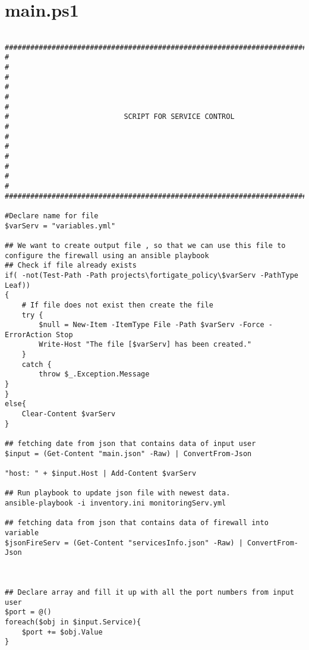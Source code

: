 \documentclass[dutch,dit,thesis]{hogentreport}
\begin{document}
\section{main.ps1}
\label{code:main.ps1}
\begin{lstlisting}[caption={main.ps1 Powershell script}]

###################################################################################
#                                                                                 #
#                                                                                 #
#                                                                                 #  
#                           SCRIPT FOR SERVICE CONTROL                            #                  
#                                                                                 #
#                                                                                 #  
#                                                                                 #
###################################################################################

#Declare name for file 
$varServ = "variables.yml"

## We want to create output file , so that we can use this file to configure the firewall using an ansible playbook
## Check if file already exists
if( -not(Test-Path -Path projects\fortigate_policy\$varServ -PathType Leaf)) 
{
    # If file does not exist then create the file 
    try {
        $null = New-Item -ItemType File -Path $varServ -Force -ErrorAction Stop
        Write-Host "The file [$varServ] has been created."
    }
    catch {
        throw $_.Exception.Message
}
}
else{
    Clear-Content $varServ
}

## fetching date from json that contains data of input user
$input = (Get-Content "main.json" -Raw) | ConvertFrom-Json

"host: " + $input.Host | Add-Content $varServ

## Run playbook to update json file with newest data.
ansible-playbook -i inventory.ini monitoringServ.yml

## fetching data from json that contains data of firewall into variable
$jsonFireServ = (Get-Content "servicesInfo.json" -Raw) | ConvertFrom-Json



## Declare array and fill it up with all the port numbers from input user
$port = @()
foreach($obj in $input.Service){
    $port += $obj.Value
}


\end{lstlisting}
\end{document}
